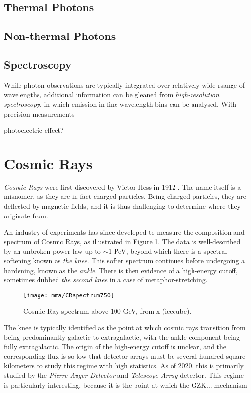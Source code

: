  \subsection*{Thermal Photons}

 \subsection*{Non-thermal Photons}
 
 \subsection*{Spectroscopy}
 
While photon observations are typically integrated over relatively-wide rsange of wavelengths, additional information can be gleaned from \emph{high-resolution spectroscopy}, in which emission in fine wavelength bins can be analysed. With precision measurements  

photoelectric effect?

\section{Cosmic Rays}

\emph{Cosmic Rays} were first discovered by Victor Hess in 1912 . The name itself is a misnomer, as they are in fact charged particles. Being charged particles, they are deflected by magnetic fields, and it is thus challenging to determine where they originate from.

An industry of experiments has since developed to measure the composition and spectrum of Cosmic Rays, as illustrated in Figure \ref{fig:CR_spectrum}. The data is well-described by an unbroken power-law up to $\sim$1 PeV, beyond which there is a spectral softening known as \emph{the knee}. This softer spectrum continues before undergoing a hardening, known as the \emph{ankle}. There is then evidence of a high-energy cutoff, sometimes dubbed \emph{the second knee} in a case of metaphor-stretching.

\begin{figure}[!ht]
	\centering \texttt{[image: mma/CRspectrum750]}
	\caption{Cosmic Ray spectrum above 100 GeV, from x (icecube).}
	\label{fig:CR_spectrum}
\end{figure}

The knee is typically identified as the point at which cosmic rays transition from being predominantly galactic to extragalactic, with the ankle component being fully extragalactic. The origin of the high-energy cutoff is unclear, and the corresponding flux is so low that detector arrays must be several hundred square kilometers to study this regime with high statistics. As of 2020, this is primarily studied by the \emph{Pierre Auger Detector} and \emph {Telescope Array} detector. This regime is particularly interesting, because it is the point at which the GZK... mechanism 

